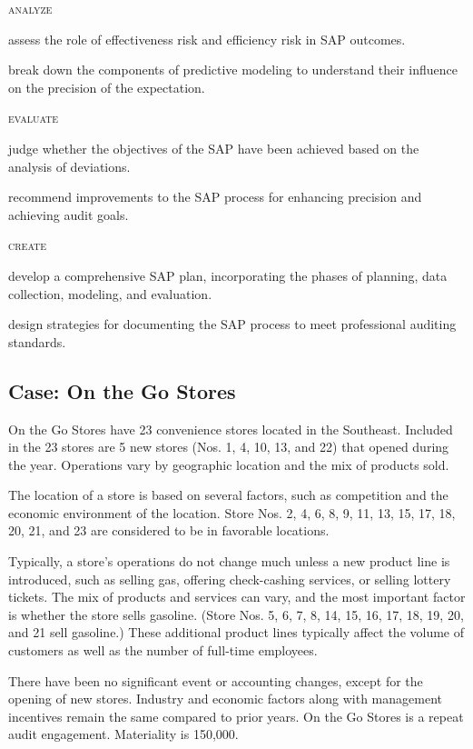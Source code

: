 \textsc{analyze}
\begin{compactitem}
\item assess the role of effectiveness risk and efficiency risk in SAP outcomes.
\item break down the components of predictive modeling to understand their influence on the precision of the expectation.
\end{compactitem}

\textsc{evaluate}
\begin{compactitem}
\item judge whether the objectives of the SAP have been achieved based on the analysis of deviations.
\item recommend improvements to the SAP process for enhancing precision and achieving audit goals.
\end{compactitem}

\textsc{create}
\begin{compactitem}
\item develop a comprehensive SAP plan, incorporating the phases of planning, data collection, modeling, and evaluation.
\item design strategies for documenting the SAP process to meet professional auditing standards.
\end{compactitem}

\begin{mdframed}[hidealllines=true,backgroundcolor=gray!20]
\section*{Case: On the Go Stores}

On the Go Stores have 23 convenience stores located in the Southeast. Included in the 23 stores are 5 new stores (Nos. 1, 4, 10, 13, and 22) that opened during the year. Operations vary by geographic location and the mix of products sold.

The location of a store is based on several factors, such as competition and the economic environment of the location. Store Nos. 2, 4, 6, 8, 9, 11, 13, 15, 17, 18, 20, 21, and 23 are considered to be in favorable locations.

Typically, a store's operations do not change much unless a new product line is introduced, such as selling gas, offering check-cashing services, or selling lottery tickets. The mix of products and services can vary, and the most important factor is whether the store sells gasoline. (Store Nos. 5, 6, 7, 8, 14, 15, 16, 17, 18, 19, 20, and 21 sell gasoline.) These additional product lines typically affect the volume of customers as well as the number of full-time employees.

There have been no significant event or accounting changes, except for the opening of new stores. Industry and economic factors along with management incentives remain the same compared to prior years. On the Go Stores is a repeat audit engagement. Materiality is 150,000.

\end{mdframed}


